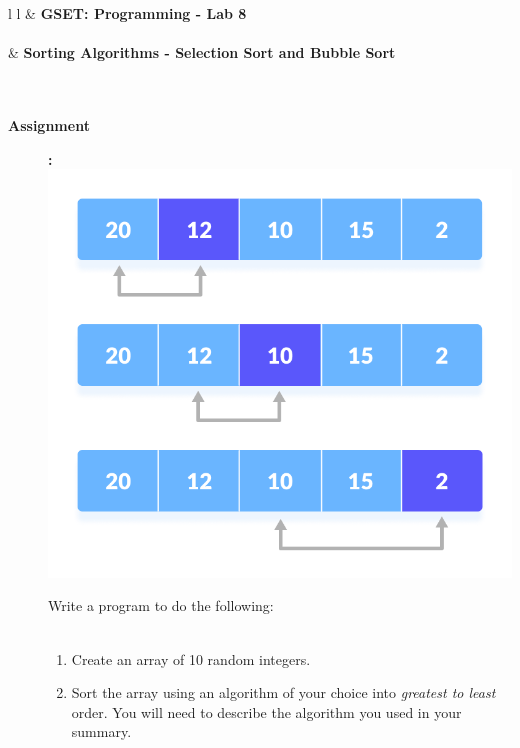 \documentclass[11pt]{article}
\newcommand{\NUM}{8}
\begin{document}
	\begin{tabular}{ l l }
  &\vspace{3mm} \textbf{ \LARGE GSET: Programming - Lab \NUM } \\\\
  & \textbf{\LARGE Sorting Algorithms - Selection Sort and Bubble Sort} \\\\\\
\end{tabular}
		
	\begin{description}
		
	
        
        \item [\textbf{Assignment}]\textbf{:} \\            
            
\includegraphics[scale=0.75]{lab8_fig1.png}

            Write a program to do the following:\\\\
            \begin{enumerate}
	
		\item Create an array of 10 random integers.		\\

                \item Sort the array using an algorithm of your choice into {\it greatest to least} order. You will need to describe the algorithm you used in your summary.\\
                

\end{enumerate}
\end{description}
\end{document}
